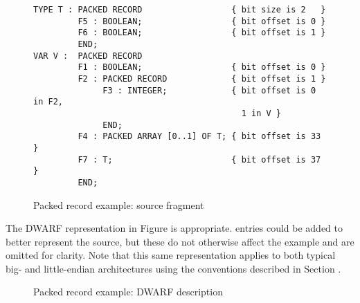 \begin{figure}[ht]
\begin{lstlisting}
TYPE T : PACKED RECORD                  { bit size is 2   }
         F5 : BOOLEAN;                  { bit offset is 0 }
         F6 : BOOLEAN;                  { bit offset is 1 }
         END;
VAR V :  PACKED RECORD
         F1 : BOOLEAN;                  { bit offset is 0 }
         F2 : PACKED RECORD             { bit offset is 1 }
              F3 : INTEGER;             { bit offset is 0 in F2, 
                                          1 in V }
              END;
         F4 : PACKED ARRAY [0..1] OF T; { bit offset is 33 }
         F7 : T;                        { bit offset is 37 }
         END;
\end{lstlisting}
\caption{Packed record example: source fragment}
\label{fig:packedrecordexamplesourcefragment}
\end{figure}

The DWARF representation in 
Figure  
is appropriate. 
\DWTAGpackedtype{} entries could be added to
better represent the source, but these do not otherwise affect
the example and are omitted for clarity. Note that this same
representation applies to both typical big- and 
little-endian
architectures using the conventions described in 
Section .

\begin{figure}[ht]
\caption{Packed record example: DWARF description}
\label{fig:packedrecordexampledwarfdescription}
\end{figure}

